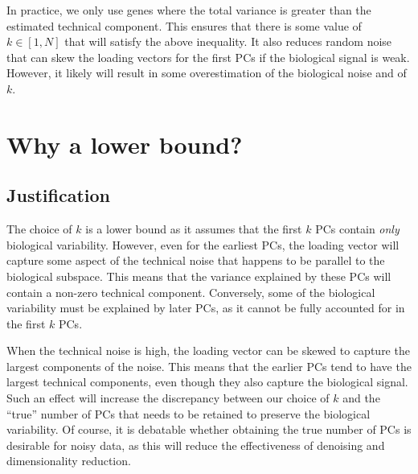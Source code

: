\documentclass{article}
\begin{document}

In practice, we only use genes where the total variance is greater than the estimated technical component.
This ensures that there is some value of $k \in [1, N]$ that will satisfy the above inequality.
It also reduces random noise that can skew the loading vectors for the first PCs if the biological signal is weak.
However, it likely will result in some overestimation of the biological noise and of $k$.

\section{Why a lower bound?} 

\subsection{Justification}
The choice of $k$ is a lower bound as it assumes that the first $k$ PCs contain \textit{only} biological variability.
However, even for the earliest PCs, the loading vector will capture some aspect of the technical noise that happens to be parallel to the biological subspace.
This means that the variance explained by these PCs will contain a non-zero technical component.
Conversely, some of the biological variability must be explained by later PCs, as it cannot be fully accounted for in the first $k$ PCs.

When the technical noise is high, the loading vector can be skewed to capture the largest components of the noise.
This means that the earlier PCs tend to have the largest technical components, even though they also capture the biological signal.
Such an effect will increase the discrepancy between our choice of $k$ and the ``true'' number of PCs that needs to be retained to preserve the biological variability.
Of course, it is debatable whether obtaining the true number of PCs is desirable for noisy data, as this will reduce the effectiveness of denoising and dimensionality reduction. 
\end{document}
